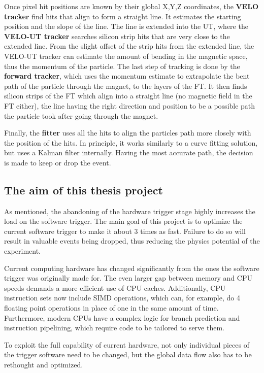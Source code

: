 \documentclass[12pt]{article}
\begin{document}
Once pixel hit positions are known by their global X,Y,Z coordinates, the \textbf{VELO tracker} find hits that align to form a straight line. It estimates the starting position and the slope of the line. The line is extended into the UT, where the \textbf{VELO-UT tracker} searches silicon strip hits that are very close to the extended line. From the slight offset of the strip hits from the extended line, the VELO-UT tracker can estimate the amount of bending in the magnetic space, thus the momentum of the particle. The last step of tracking is done by the \textbf{forward tracker}, which uses the momentum estimate to extrapolate the bent path of the particle through the magnet, to the layers of the FT. It then finds silicon strips of the FT which align into a straight line (no magnetic field in the FT either), the line having the right direction and position to be a possible path the particle took after going through the magnet.

Finally, the \textbf{fitter} uses all the hits to align the particles path more closely with the position of the hits. In principle, it works similarly to a curve fitting solution, but uses a Kalman filter internally. Having the most accurate path, the decision is made to keep or drop the event.

\subsection{The aim of this thesis project}

As mentioned, the abandoning of the hardware trigger stage highly increases the load on the software trigger. The main goal of this project is to optimize the current software trigger to make it about 3 times as fast. Failure to do so will result in valuable events being dropped, thus reducing the physics potential of the experiment.

Current computing hardware has changed significantly from the ones the software trigger was originally made for. The even larger gap between memory and CPU speeds demands a more efficient use of CPU caches. Additionally, CPU instruction sets now include SIMD operations, which can, for example, do 4 floating point operations in place of one in the same amount of time. Furthermore, modern CPUs have a complex logic for branch prediction and instruction pipelining, which require code to be tailored to serve them.

To exploit the full capability of current hardware, not only individual pieces of the trigger software need to be changed, but the global data flow also has to be rethought and optimized.
\end{document}
